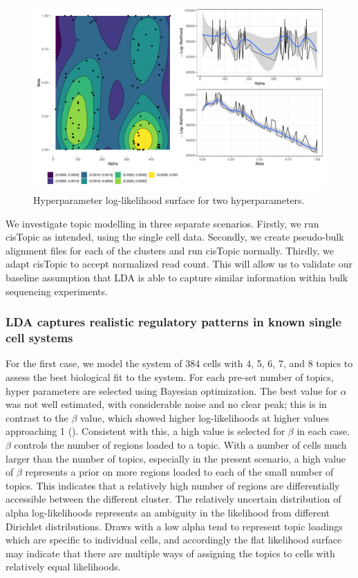 \begin{figure}
  \centering
  \includegraphics[width=\textwidth]{plot/ch4/sim_ll_surface.pdf}
  \caption{Hyperparameter log-likelihood surface for two hyperparameters.}
  \label{fig:llhood_surfacea_simulation}
\end{figure}

We investigate topic modelling in three separate scenarios. Firstly, we run cisTopic as intended, using the single cell data. Secondly, we create pseudo-bulk alignment files for each of the clusters and run cisTopic normally. Thirdly, we adapt cisTopic to accept normalized read count. This will allow us to validate our baseline assumption that LDA is able to capture similar information within bulk sequencing experiments.

\subsubsection{LDA captures realistic regulatory patterns in known single cell systems} \label{ch4:sc}

For the first case, we model the system of 384 cells with 4, 5, 6, 7, and 8 topics to assess the best biological fit to the system. For each pre-set number of topics, hyper parameters are selected using Bayesian optimization. The best value for $\alpha$ was not well estimated, with considerable noise and no clear peak; this is in contrast to the $\beta$ value, which showed higher log-likelihoods at higher values approaching 1 (). Consistent with this, a high value is selected for $\beta$ in each case. $\beta$ controls the number of regions loaded to a topic. With a number of cells much larger than the number of topics, especially in the present scenario, a high value of $\beta$ represents a prior on more regions loaded to each of the small number of topics. This indicates that a relatively high number of regions are differentially accessible between the different cluster. The relatively uncertain distribution of alpha log-likelihoods represents an ambiguity in the likelihood from different Dirichlet distributions. Draws with a low alpha tend to represent topic loadings which are specific to individual cells, and accordingly the flat likelihood surface may indicate that there are multiple ways of assigning the topics to cells with relatively equal likelihoods.

